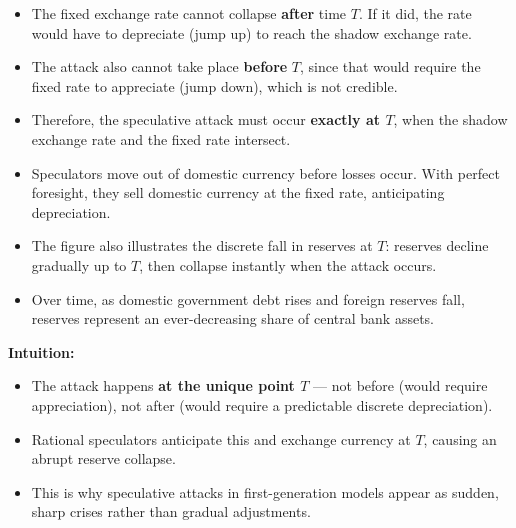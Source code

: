 \documentclass[12pt]{article}
\begin{document}
\begin{itemize}
    \item The fixed exchange rate cannot collapse \textbf{after} time $T$. If it did, the rate would have to depreciate (jump up) to reach the shadow exchange rate.
    \item The attack also cannot take place \textbf{before} $T$, since that would require the fixed rate to appreciate (jump down), which is not credible.
    \item Therefore, the speculative attack must occur \textbf{exactly at $T$}, when the shadow exchange rate and the fixed rate intersect.
    \item Speculators move out of domestic currency before losses occur. With perfect foresight, they sell domestic currency at the fixed rate, anticipating depreciation.
    \item The figure also illustrates the discrete fall in reserves at $T$: reserves decline gradually up to $T$, then collapse instantly when the attack occurs.
    \item Over time, as domestic government debt rises and foreign reserves fall, reserves represent an ever-decreasing share of central bank assets.
\end{itemize}

\noindent\textbf{Intuition:}
\begin{itemize}
    \item The attack happens \textbf{at the unique point $T$} — not before (would require appreciation), not after (would require a predictable discrete depreciation).  
    \item Rational speculators anticipate this and exchange currency at $T$, causing an abrupt reserve collapse.  
    \item This is why speculative attacks in first-generation models appear as sudden, sharp crises rather than gradual adjustments.  
\end{itemize}
\end{document}
